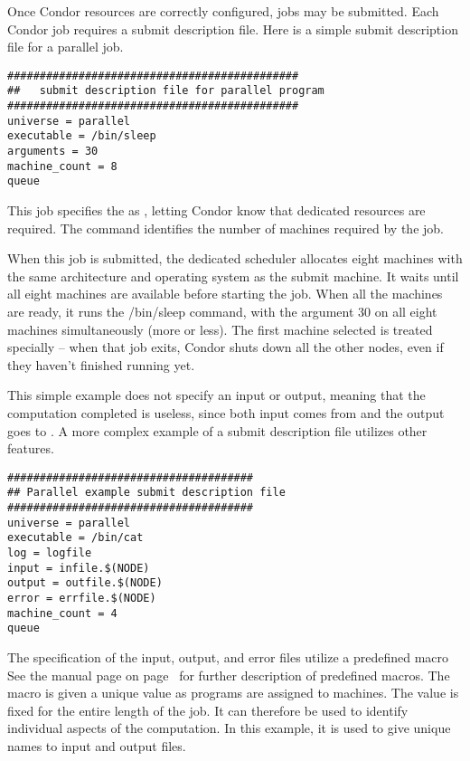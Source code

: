 Once Condor resources are correctly configured, jobs may be submitted.
Each Condor job requires a submit description file.  Here is a simple
submit description file for a parallel job.

\begin{verbatim}
#############################################
##   submit description file for parallel program
#############################################
universe = parallel
executable = /bin/sleep
arguments = 30
machine_count = 8
queue 
\end{verbatim}

This job specifies the  as , letting
Condor know that dedicated resources are required.  The
 command identifies the number of machines
required by the job. 

When this job is submitted, the dedicated scheduler allocates eight
machines with the same architecture and operating system as the submit
machine.  It waits until all eight machines are available before
starting the job.  When all the machines are ready, it runs the
/bin/sleep command, with the argument 30 on all eight machines
simultaneously (more or less).  The first machine selected is treated
specially -- when that job exits, Condor shuts down all the other
nodes, even if they haven't finished running yet.

This simple example does not specify an input or output,
meaning that the computation completed is useless,
since both input comes from and the output goes to .
A more complex example of a submit description file
utilizes other features.
\begin{verbatim}
######################################
## Parallel example submit description file
######################################
universe = parallel
executable = /bin/cat
log = logfile
input = infile.$(NODE)
output = outfile.$(NODE)
error = errfile.$(NODE)
machine_count = 4
queue
\end{verbatim}

The specification of the input, output, and error files utilize a
predefined macro  See the 
manual page on page~\pageref{man-condor-submit} for further
description of predefined macros.  The  macro is given a
unique value as programs are assigned to machines.  The
 value is fixed for the entire length of the job.  It
can therefore be used to identify individual aspects of the
computation.  In this example, it is used to give unique names to
input and output files.

